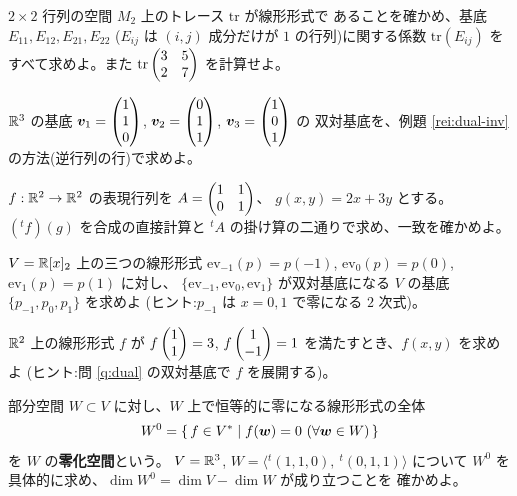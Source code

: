 \begin{mondai}[基本]\label{q:dual-ex4}
$2 \times 2$ 行列の空間 $M_2$ 上のトレース $\mathrm{tr}$ が線形形式で
あることを確かめ、基底 $E_{11}, E_{12}, E_{21}, E_{22}$
($E_{ij}$ は $(i,j)$ 成分だけが $1$ の行列)に関する係数
$\mathrm{tr}(E_{ij})$ をすべて求めよ。また
$\mathrm{tr}\begin{pmatrix}3 & 5 \\ 2 & 7\end{pmatrix}$ を計算せよ。
\end{mondai}

\begin{mondai}[標準]\label{q:dual-ex5}
$\mathbb{R}^3$ の基底 $\bm{v}_1 = \begin{pmatrix}1 \\ 1 \\ 0\end{pmatrix}$,
$\bm{v}_2 = \begin{pmatrix}0 \\ 1 \\ 1\end{pmatrix}$, $\bm{v}_3 = \begin{pmatrix}1 \\ 0 \\ 1\end{pmatrix}$ の
双対基底を、例題 \ref{rei:dual-inv} の方法(逆行列の行)で求めよ。
\end{mondai}

\begin{mondai}[標準]\label{q:dual-ex6}
$f : \mathbb{R}^2 \to \mathbb{R}^2$ の表現行列を $A = \begin{pmatrix}1 & 1 \\ 0 & 1\end{pmatrix}$、
$g(x, y) = 2x + 3y$ とする。$({}^tf)(g)$ を合成の直接計算と
${}^t\!A$ の掛け算の二通りで求め、一致を確かめよ。
\end{mondai}

\begin{mondai}[標準]\label{q:dual-ex7}
$V = \mathbb{R}[x]_2$ 上の三つの線形形式
$\mathrm{ev}_{-1}(p) = p(-1)$, $\mathrm{ev}_0(p) = p(0)$,
$\mathrm{ev}_1(p) = p(1)$ に対し、
$\{\mathrm{ev}_{-1}, \mathrm{ev}_0, \mathrm{ev}_1\}$ が双対基底になる
$V$ の基底 $\{p_{-1}, p_0, p_1\}$ を求めよ
(ヒント:$p_{-1}$ は $x = 0, 1$ で零になる $2$ 次式)。
\end{mondai}

\begin{mondai}[標準]\label{q:dual-ex8}
$\mathbb{R}^2$ 上の線形形式 $f$ が $f\begin{pmatrix}1 \\ 1\end{pmatrix} = 3$,
$f\begin{pmatrix}1 \\ -1\end{pmatrix} = 1$ を満たすとき、$f(x, y)$ を求めよ
(ヒント:問 \ref{q:dual} の双対基底で $f$ を展開する)。
\end{mondai}

\begin{mondai}[発展]\label{q:dual-ex9}
部分空間 $W \subset V$ に対し、$W$ 上で恒等的に零になる線形形式の全体
\[
W^{0} = \{\, f \in V^{*} \mid f(\bm{w}) = 0 \ (\forall \bm{w} \in W) \,\}
\]
を $W$ の\textbf{零化空間}という。
$V = \mathbb{R}^3$, $W = \langle {}^t(1, 1, 0),\ {}^t(0, 1, 1) \rangle$ について
$W^{0}$ を具体的に求め、$\dim W^{0} = \dim V - \dim W$ が成り立つことを
確かめよ。
\end{mondai}

